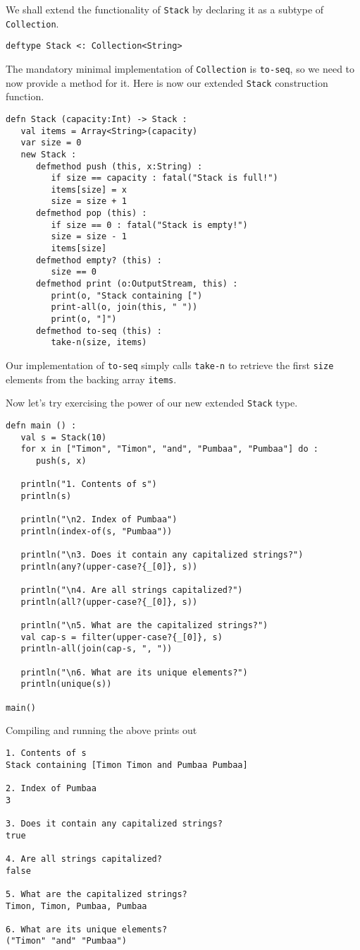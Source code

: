 \documentclass[10pt,oneside]{book}
\begin{document}
We shall extend the functionality of \texttt{\frenchspacing Stack} by declaring it as a subtype of \texttt{\frenchspacing Collection}. 
\begin{lstlisting}
deftype Stack <: Collection<String>
\end{lstlisting}
The mandatory minimal implementation of \texttt{\frenchspacing Collection} is \texttt{\frenchspacing to-seq}, so we need to now provide a method for it. Here is now our extended \texttt{\frenchspacing Stack} construction function.
\begin{lstlisting}
defn Stack (capacity:Int) -> Stack :
   val items = Array<String>(capacity)
   var size = 0
   new Stack :
      defmethod push (this, x:String) :
         if size == capacity : fatal("Stack is full!")
         items[size] = x
         size = size + 1
      defmethod pop (this) :
         if size == 0 : fatal("Stack is empty!")
         size = size - 1
         items[size]
      defmethod empty? (this) :
         size == 0
      defmethod print (o:OutputStream, this) :
         print(o, "Stack containing [")
         print-all(o, join(this, " "))
         print(o, "]")
      defmethod to-seq (this) :
         take-n(size, items)
\end{lstlisting}
Our implementation of \texttt{\frenchspacing to-seq} simply calls \texttt{\frenchspacing take-n} to retrieve the first \texttt{\frenchspacing size} elements from the backing array \texttt{\frenchspacing items}.

Now let's try exercising the power of our new extended \texttt{\frenchspacing Stack} type. 
\begin{lstlisting}
defn main () :
   val s = Stack(10)
   for x in ["Timon", "Timon", "and", "Pumbaa", "Pumbaa"] do :
      push(s, x)

   println("1. Contents of s")
   println(s)

   println("\n2. Index of Pumbaa")
   println(index-of(s, "Pumbaa"))

   println("\n3. Does it contain any capitalized strings?")
   println(any?(upper-case?{_[0]}, s))

   println("\n4. Are all strings capitalized?")
   println(all?(upper-case?{_[0]}, s))

   println("\n5. What are the capitalized strings?")
   val cap-s = filter(upper-case?{_[0]}, s)
   println-all(join(cap-s, ", "))

   println("\n6. What are its unique elements?")
   println(unique(s))

main()
\end{lstlisting}
Compiling and running the above prints out
\begin{lstlisting}
1. Contents of s
Stack containing [Timon Timon and Pumbaa Pumbaa]

2. Index of Pumbaa
3

3. Does it contain any capitalized strings?
true

4. Are all strings capitalized?
false

5. What are the capitalized strings?
Timon, Timon, Pumbaa, Pumbaa

6. What are its unique elements?
("Timon" "and" "Pumbaa")
\end{lstlisting}
\end{document}
